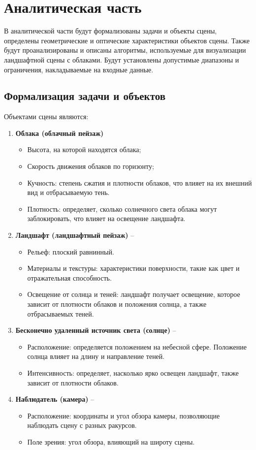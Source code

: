 \chapter{Аналитическая часть}
В аналитической части будут формализованы задачи и объекты сцены, определены геометрические и оптические характеристики объектов сцены. Также будут проанализированы и описаны алгоритмы, используемые для визуализации ландшафтной сцены с облаками. Будут установлены допустимые диапазоны и ограничения, накладываемые на входные данные.

\section{Формализация задачи и объектов}

Объектами сцены являются:
\begin{enumerate}
	\item \textbf{Облака (облачный пейзаж)}
	\begin{itemize}
		\item Высота, на которой находятся облака;
		\item Скорость движения облаков по горизонту;
		\item Кучность: степень сжатия и плотности облаков, что влияет на их внешний вид и отбрасываемую тень.
		\item Плотность: определяет, сколько солнечного света облака могут заблокировать, что влияет на освещение ландшафта.
	\end{itemize}
	\item \textbf{Ландшафт (ландшафтный пейзаж)} -- 
	\begin{itemize}
		\item Рельеф: плоский равнинный.
		\item Материалы и текстуры: характеристики поверхности, такие как цвет и отражательная способность.
		\item Освещение от солнца и теней: ландшафт получает освещение, которое зависит от плотности облаков и положения солнца, а также отбрасываемых теней.
	\end{itemize}
	\item \textbf{Бесконечно удаленный источник света (солнце)} --
	\begin{itemize}
		\item Расположение: определяется положением на небесной сфере. Положение солнца влияет на длину и направление теней.
		\item Интенсивность: определяет, насколько ярко освещен ландшафт, также зависит от плотности облаков.
	\end{itemize}
	\item \textbf{Наблюдатель (камера)} --
	\begin{itemize}
		\item Расположение: координаты и угол обзора камеры, позволяющие наблюдать сцену с разных ракурсов.
		\item Поле зрения: угол обзора, влияющий на широту сцены.
	\end{itemize}
\end{enumerate}

